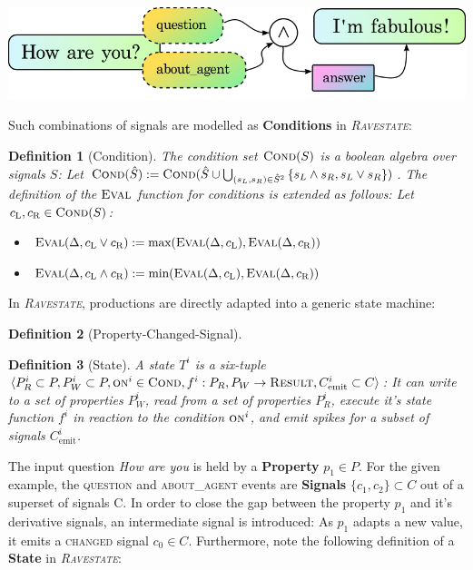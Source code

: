 \documentclass{article}
\newcommand{\rasta}{\textit{\textsc{Ravestate}}\xspace}
\newcommand{\mathsc}[1]{\text{\textsc{#1}}}
\newenvironment{Figure}
  {\par\medskip\noindent\minipage{\linewidth}}
  {\endminipage\par\medskip}
\newtheorem{definition}{Definition}
\begin{document}
\begin{multicols}{2}
\begin{Figure}
\centering
\includegraphics[scale=0.7]{figs/ex1.png}
\label{fig:ex1}
\end{Figure}

Such combinations of signals are modelled as \textbf{Conditions} in \rasta:

\begin{definition}[Condition]
The condition set $\mathsc{Cond}(S)$ is a boolean algebra over signals $S$: Let $\mathsc{Cond}(\hat{S}) := \mathsc{Cond}(\hat{S} \cup \bigcup_{(s_L, s_R) \in \hat{S}^2}{\{s_L \land s_R, s_L \lor s_R\}})$. The definition of the $\mathsc{Eval}$ function for conditions is extended as follows: Let $c_\text{L}, c_\text{R} \in \mathsc{Cond}(S)$:
\begin{itemize}
    \item $\mathsc{Eval}(\Delta, c_\text{L} \lor c_\text{R}) := \text{max}( \mathsc{Eval}(\Delta, c_\text{L}), \mathsc{Eval}(\Delta, c_\text{R}) )$
    \item $\mathsc{Eval}(\Delta, c_\text{L} \land c_\text{R}) := \text{min}( \mathsc{Eval}(\Delta, c_\text{L}), \mathsc{Eval}(\Delta, c_\text{R}) )$
\end{itemize}
\end{definition}

In \rasta, productions are directly adapted into a generic state machine: 

\begin{definition}[Property-Changed-Signal]
\end{definition}

\begin{definition}[State]
A state $T^i$ is a six-tuple $\langle P^i_R \subset P, P^i_W \subset P, \mathsc{on}^i \in \mathsc{Cond}, f^i : P_R, P_W \rightarrow \mathsc{Result}, C^i_\text{emit} \subset C \rangle$: It can write to a set of properties $P^i_W$, read from a set of properties $P^i_R$, execute it's state function $f^i$ in reaction to the condition $\text{\textsc{on}}^i$, and emit spikes for a subset of signals $C^i_\text{emit}$. 
\end{definition}

The input question \textit{How are you} is held by a \textbf{Property} $p_1 \in P$. For the given example, the \textsc{question} and \textsc{about\_agent} events are \textbf{Signals} $\{c_1, c_2\} \subset C$ out of a superset of signals C. In order to close the gap between the property $p_1$ and it's derivative signals, an intermediate signal is introduced: As $p_1$ adapts a new value, it emits a \textsc{changed} signal $c_0 \in C$. Furthermore, note the following definition of a \textbf{State} in \rasta:


\end{multicols}
\end{document}

